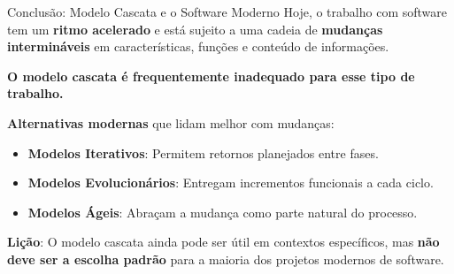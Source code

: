 \documentclass[9pt]{beamer}
\begin{document}
\begin{frame}{Conclusão: Modelo Cascata e o Software Moderno}
  Hoje, o trabalho com software tem um \textbf{ritmo acelerado} e está sujeito a uma cadeia de \textbf{mudanças intermináveis} em características, funções e conteúdo de informações.

  \vspace{0.4cm}
  \centering
  \colorbox{red!8}{
    \parbox{0.9\textwidth}{
      \small
      \textbf{O modelo cascata é frequentemente inadequado para esse tipo de trabalho.}
    }
  }

  \vspace{0.4cm}
  \flushleft
  \textbf{Alternativas modernas} que lidam melhor com mudanças:
  \begin{itemize}
    \item \textbf{Modelos Iterativos}: Permitem retornos planejados entre fases.
    \item \textbf{Modelos Evolucionários}: Entregam incrementos funcionais a cada ciclo.
    \item \textbf{Modelos Ágeis}: Abraçam a mudança como parte natural do processo.
  \end{itemize}

  \vspace{0.3cm}
  \centering
  \colorbox{green!8}{
    \parbox{0.9\textwidth}{
      \scriptsize
      \textbf{Lição}: O modelo cascata ainda pode ser útil em contextos específicos, mas \textbf{não deve ser a escolha padrão} para a maioria dos projetos modernos de software.
    }
  }
\end{frame}

\end{document}
